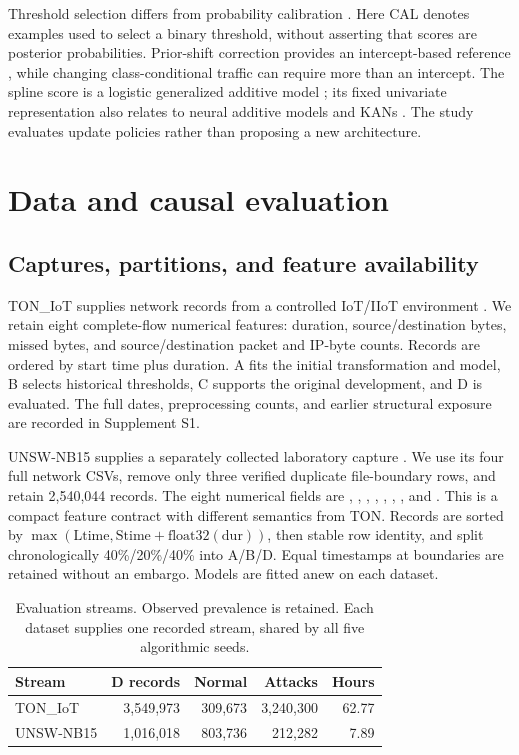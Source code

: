 Threshold selection differs from probability calibration \citep{guo2017}. Here CAL denotes examples used to select a binary threshold, without asserting that scores are posterior probabilities. Prior-shift correction provides an intercept-based reference \citep{saerens2002,lipton2018}, while changing class-conditional traffic can require more than an intercept. The spline score is a logistic generalized additive model \citep{hastie1986}; its fixed univariate representation also relates to neural additive models and KANs \citep{agarwal2021,liu2025}. The study evaluates update policies rather than proposing a new architecture.

\section{Data and causal evaluation}
\subsection{Captures, partitions, and feature availability}
TON\_IoT supplies network records from a controlled IoT/IIoT environment \citep{moustafa2021,booij2022}. We retain eight complete-flow numerical features: duration, source/destination bytes, missed bytes, and source/destination packet and IP-byte counts. Records are ordered by start time plus duration. A fits the initial transformation and model, B selects historical thresholds, C supports the original development, and D is evaluated. The full dates, preprocessing counts, and earlier structural exposure are recorded in Supplement S1.

UNSW-NB15 supplies a separately collected laboratory capture \citep{moustafa2015unsw,moustafa2016unsw}. We use its four full network CSVs, remove only three verified duplicate file-boundary rows, and retain 2,540,044 records. The eight numerical fields are , , , , , , , and . This is a compact feature contract with different semantics from TON. Records are sorted by $\max(\mathrm{Ltime},\mathrm{Stime}+\mathrm{float32}(\mathrm{dur}))$, then stable row identity, and split chronologically 40\%/20\%/40\% into A/B/D. Equal timestamps at boundaries are retained without an embargo. Models are fitted anew on each dataset.

\begin{table}[tb]
\centering\small
\caption{Evaluation streams. Observed prevalence is retained. Each dataset supplies one recorded stream, shared by all five algorithmic seeds.}
\label{tab:data}
\begin{tabular}{lrrrr}
\toprule
Stream & D records & Normal & Attacks & Hours \\
\midrule
TON\_IoT & 3,549,973 & 309,673 & 3,240,300 & 62.77 \\
UNSW-NB15 & 1,016,018 & 803,736 & 212,282 & 7.89 \\
\bottomrule
\end{tabular}
\end{table}

